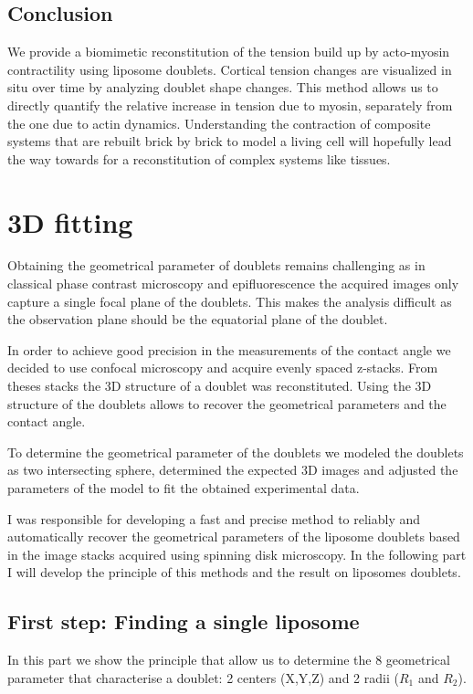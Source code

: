 \documentclass[A4paperpaper,11pt,english]{sphinxmanual}
\begin{document}
\subsection{Conclusion}
\label{parts/part4:conclusion}
We provide a biomimetic reconstitution of the tension build up by acto-myosin
contractility using liposome doublets. Cortical tension changes are visualized
in situ over time by analyzing doublet shape changes. This method allows us
to directly quantify the relative increase in tension due to myosin, separately
from the one due to actin dynamics. Understanding the contraction of composite systems
that are rebuilt brick by brick to model a living cell will hopefully lead the way towards for a reconstitution
of complex systems like tissues.


\section{3D fitting}
\label{parts/part4:full3dfit}\label{parts/part4:d-fitting}
Obtaining the geometrical parameter of doublets remains challenging as in
classical phase contrast microscopy and epifluorescence  the acquired images
only capture a single focal plane of the doublets. This makes the analysis
difficult as the observation plane should be the
equatorial plane of the doublet.

In order to achieve good precision in the measurements of the contact angle we
decided to use confocal microscopy and acquire evenly spaced z-stacks. From
theses stacks the 3D structure of a doublet was reconstituted. Using the 3D
structure of the doublets allows to recover the geometrical parameters and
the contact angle.

To determine the geometrical parameter of the doublets
we modeled the doublets as two intersecting sphere, determined the expected 3D
images and adjusted the parameters of the model to fit the obtained
experimental data.

I was responsible for developing a fast and precise method to reliably and
automatically recover the geometrical parameters of the liposome doublets
based in the image stacks acquired using spinning disk microscopy. In the following part I will develop the principle of this
methods and the result on liposomes doublets.


\subsection{First step: Finding a single liposome}
\label{parts/part4:first-step-finding-a-single-liposome}
In this part we show the principle that allow us to determine the 8
geometrical parameter that characterise a doublet: 2 centers (X,Y,Z) and 2 radii
(\(R_1\) and \(R_2\)).
\end{document}
